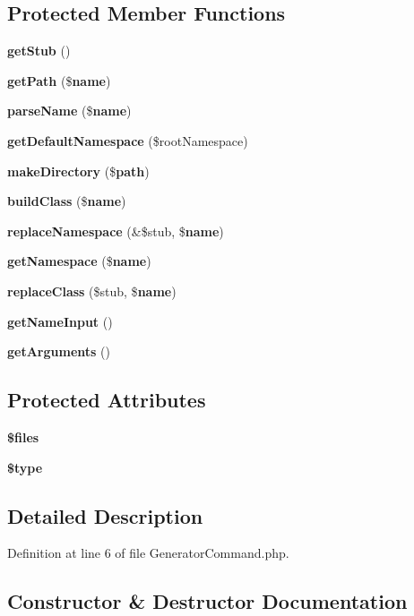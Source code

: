 \subsection*{Protected Member Functions}
\begin{DoxyCompactItemize}
\item 
{\bf get\+Stub} ()
\item 
{\bf get\+Path} (\${\bf name})
\item 
{\bf parse\+Name} (\${\bf name})
\item 
{\bf get\+Default\+Namespace} (\$root\+Namespace)
\item 
{\bf make\+Directory} (\${\bf path})
\item 
{\bf build\+Class} (\${\bf name})
\item 
{\bf replace\+Namespace} (\&\$stub, \${\bf name})
\item 
{\bf get\+Namespace} (\${\bf name})
\item 
{\bf replace\+Class} (\$stub, \${\bf name})
\item 
{\bf get\+Name\+Input} ()
\item 
{\bf get\+Arguments} ()
\end{DoxyCompactItemize}
\subsection*{Protected Attributes}
\begin{DoxyCompactItemize}
\item 
{\bf \$files}
\item 
{\bf \$type}
\end{DoxyCompactItemize}


\subsection{Detailed Description}


Definition at line 6 of file Generator\+Command.\+php.



\subsection{Constructor \& Destructor Documentation}
